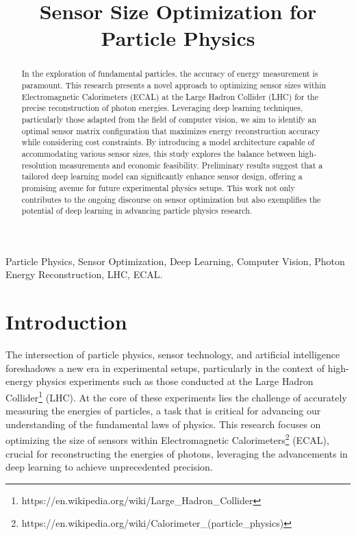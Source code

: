 \documentclass[conference]{IEEEtran}
\begin{document}
\title{Sensor Size Optimization for Particle Physics
}

\author{
}

\maketitle
\begin{abstract}
    In the exploration of fundamental particles, the accuracy of energy measurement is paramount. This research presents a novel approach to optimizing sensor sizes within Electromagnetic Calorimeters (ECAL) at the Large Hadron Collider (LHC) for the precise reconstruction of photon energies. Leveraging deep learning techniques, particularly those adapted from the field of computer vision, we aim to identify an optimal sensor matrix configuration that maximizes energy reconstruction accuracy while considering cost constraints. By introducing a model architecture capable of accommodating various sensor sizes, this study explores the balance between high-resolution measurements and economic feasibility. Preliminary results suggest that a tailored deep learning model can significantly enhance sensor design, offering a promising avenue for future experimental physics setups. This work not only contributes to the ongoing discourse on sensor optimization but also exemplifies the potential of deep learning in advancing particle physics research.
\end{abstract}

\begin{IEEEkeywords}
    Particle Physics, Sensor Optimization, Deep Learning, Computer Vision, Photon Energy Reconstruction, LHC, ECAL.
\end{IEEEkeywords}

\section{Introduction}

The intersection of particle physics, sensor technology, and artificial intelligence foreshadows a new era in experimental setups, particularly in the context of high-energy physics experiments such as those conducted at the Large Hadron Collider\footnote{https://en.wikipedia.org/wiki/Large\_Hadron\_Collider} (LHC). At the core of these experiments lies the challenge of accurately measuring the energies of particles, a task that is critical for advancing our understanding of the fundamental laws of physics. This research focuses on optimizing the size of sensors within Electromagnetic Calorimeters\footnote{https://en.wikipedia.org/wiki/Calorimeter\_(particle\_physics)} (ECAL), crucial for reconstructing the energies of photons, leveraging the advancements in deep learning to achieve unprecedented precision.
\end{document}
